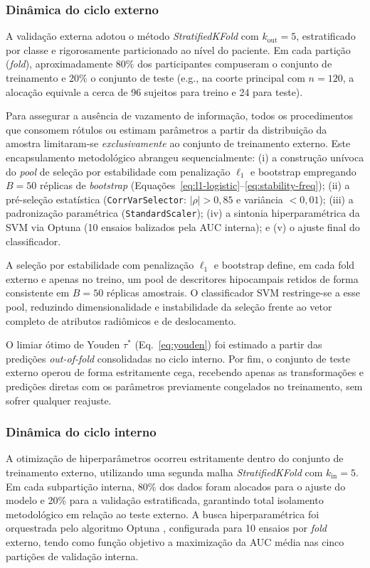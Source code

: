 \documentclass[review]{elsarticle}
\newcommand{\code}[1]{\texttt{#1}}
\begin{document}
\subsubsection{Dinâmica do ciclo externo}
A validação externa adotou o método \emph{StratifiedKFold} com $k_{\mathrm{out}}=5$, estratificado por classe e rigorosamente particionado ao nível do paciente. Em cada partição (\emph{fold}), aproximadamente 80\% dos participantes compuseram o conjunto de treinamento e 20\% o conjunto de teste (e.g., na coorte principal com $n=120$, a alocação equivale a cerca de 96 sujeitos para treino e 24 para teste).

Para assegurar a ausência de vazamento de informação, todos os procedimentos que consomem rótulos ou estimam parâmetros a partir da distribuição da amostra limitaram-se \emph{exclusivamente} ao conjunto de treinamento externo. Este encapsulamento metodológico abrangeu sequencialmente: (i) a construção unívoca do \emph{pool} de seleção por estabilidade com penalização $\ell_1$ e bootstrap empregando $B=50$ réplicas de \emph{bootstrap} (Equações~\eqref{eq:l1-logistic}--\eqref{eq:stability-freq}); (ii) a pré-seleção estatística (\code{CorrVarSelector}: $|\rho|>0{,}85$ e variância $<0{,}01$); (iii) a padronização paramétrica (\code{StandardScaler}); (iv) a sintonia hiperparamétrica da SVM via Optuna (10 ensaios balizados pela AUC interna); e (v) o ajuste final do classificador.

A seleção por estabilidade com penalização $\ell_1$ e bootstrap define, em cada fold externo e apenas no treino, um pool de descritores hipocampais retidos de forma consistente em $B=50$ réplicas amostrais. O classificador SVM restringe-se a esse pool, reduzindo dimensionalidade e instabilidade da seleção frente ao vetor completo de atributos radiômicos e de deslocamento.

O limiar ótimo de Youden $\tau^*$ (Eq.~\ref{eq:youden}) foi estimado a partir das predições \emph{out-of-fold} consolidadas no ciclo interno. Por fim, o conjunto de teste externo operou de forma estritamente cega, recebendo apenas as transformações e predições diretas com os parâmetros previamente congelados no treinamento, sem sofrer qualquer reajuste.

\subsubsection{Dinâmica do ciclo interno}
A otimização de hiperparâmetros ocorreu estritamente dentro do conjunto de treinamento externo, utilizando uma segunda malha \emph{StratifiedKFold} com $k_{\mathrm{in}}=5$. Em cada subpartição interna, 80\% dos dados foram alocados para o ajuste do modelo e 20\% para a validação estratificada, garantindo total isolamento metodológico em relação ao teste externo. A busca hiperparamétrica foi orquestrada pelo algoritmo Optuna \citep{akiba-2019}, configurada para 10 ensaios por \emph{fold} externo, tendo como função objetivo a maximização da AUC média nas cinco partições de validação interna. 
\end{document}
